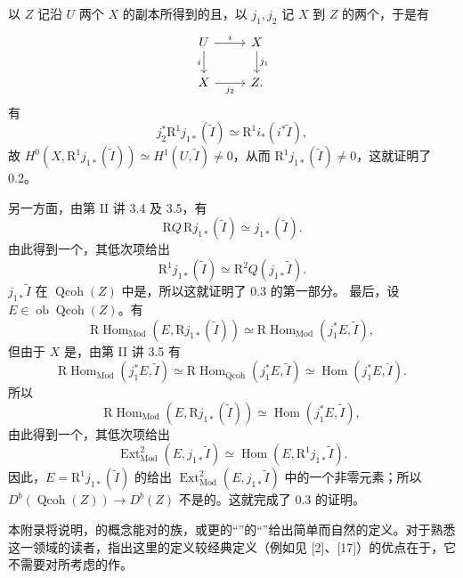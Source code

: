 以 $Z$ 记沿 $U$ 两个 $X$ 的副本所得到的且，以 $j_1,j_2$ 记 $X$ 到 $Z$ 的两个，于是有
\[\begin{tikzcd}
U\arrow[r,"i"]\arrow[d,"i"']&X\arrow[d,"j_1"]\\
X\arrow[r,"j_2"']&Z.
\end{tikzcd}\]
有
\[j_2^*\mathrm R^1j_{1*}(\widetilde I)\simeq\mathrm R^1i_*(i^*\widetilde I),\]
故 $H^0(X,\mathrm R^1j_{1*}(\widetilde I))\simeq H^1(U,\widetilde I)\ne0$，从而 $\mathrm R^1j_{1*}(\widetilde I)\ne0$，这就证明了 0.2。

另一方面，由第 II 讲 3.4 及 3.5，有
\[\mathrm RQ\,\mathrm Rj_{1*}(\widetilde I)\simeq j_{1*}(\widetilde I).\]
由此得到一个，其低次项给出
\[\mathrm R^1j_{1*}(\widetilde I)\simeq\mathrm R^2Q(j_{1*}\widetilde I).\]
 $j_{1*}\widetilde I$ 在 $\operatorname{Qcoh}(Z)$ 中是，所以这就证明了 0.3 的第一部分。
最后，设 $E\in\operatorname{ob}\operatorname{Qcoh}(Z)$。有
\[\mathrm R\operatorname{Hom}_{\mathrm{Mod}}(E,\mathrm Rj_{1*}(\widetilde I))\simeq\mathrm R\operatorname{Hom}_{\mathrm{Mod}}(j_1^*E,\widetilde I),\]
但由于 $X$ 是，由第 II 讲 3.5 有
\[\mathrm R\operatorname{Hom}_{\mathrm{Mod}}(j_1^*E,\widetilde I)\simeq\mathrm R\operatorname{Hom}_{\mathrm{Qcoh}}(j_1^*E,\widetilde I)\simeq\operatorname{Hom}(j_1^*E,\widetilde I).\]
所以
\[\mathrm R\operatorname{Hom}_{\mathrm{Mod}}(E,\mathrm Rj_{1*}(\widetilde I))\simeq\operatorname{Hom}(j_1^*E,\widetilde I),\]
由此得到一个，其低次项给出
\[\operatorname{Ext}_{\mathrm{Mod}}^2(E,j_{1*}\widetilde I)\simeq\operatorname{Hom}(E,\mathrm R^1j_{1*}\widetilde I).\]
因此，$E=\mathrm R^1j_{1*}(\widetilde I)$ 的给出 $\operatorname{Ext}_{\mathrm{Mod}}^2(E,j_{1*}\widetilde I)$ 中的一个非零元素；所以 $D^b(\operatorname{Qcoh}(Z))\to D^b(Z)$ 不是的。这就完成了 0.3 的证明。

本附录将说明，的概念能对的族，或更的“”的“”给出简单而自然的定义。对于熟悉这一领域的读者，指出这里的定义较经典定义（例如见 [2]、[17]）的优点在于，它不需要对所考虑的作。

